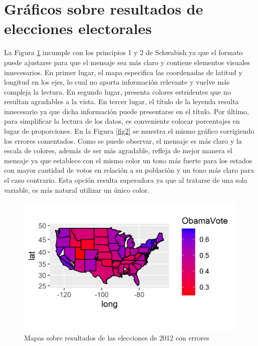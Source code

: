 \documentclass[10.5pt]{article}   %
\begin{document}
\section*{Gráficos sobre resultados de elecciones electorales}
La Figura \ref{mylabel:fig1} incumple con los principios 1 y 2 de Schwabish ya que el formato puede ajustarse para que el mensaje sea más claro y contiene elementos visuales innecesarios. En primer lugar, el mapa especifica las coordenadas de latitud y longitud en los ejes, lo cual no aporta información relevante y vuelve más compleja la lectura. En segundo lugar, presenta colores estridentes que no resultan agradables a la vista. En tercer lugar, el título de la leyenda resulta innecesario ya que dicha información puede presentarse en el título. Por último, para simplificar la lectura de los datos, es conveniente colocar porcentajes en lugar de proporciones. En la Figura \ref{fig2} se muestra el mismo gráfico corrigiendo los errores comentados. Como se puede observar, el mensaje es más claro y la escala de colores, además de ser más agradable, refleja de mejor manera el mensaje ya que establece con el mismo color un tono más fuerte para los estados con mayor cantidad de votos en relación a su población y un tono más claro para el caso contrario. Esta opción resulta superadora ya que al tratarse de una sola variable, es más natural utilizar un único color.
\begin{figure}[H]
\centering
\includegraphics[scale=1.3]{imgs/Obamavote1.png}
\caption{Mapas sobre resultados de las elecciones de 2012 con errores}
    \label{mylabel:fig1}
\end{figure}
\end{document}
